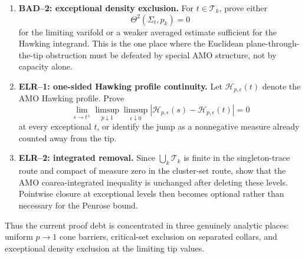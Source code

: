 \begin{remark}
\begin{enumerate}
    \item \textbf{BAD--2: exceptional density exclusion.}
    For \(t\in\mathcal T_k\), prove either
    \[
        \Theta^2(\Sigma_t,p_k)=0
    \]
    for the limiting varifold or a weaker averaged estimate sufficient for the
    Hawking integrand.  This is the one place where the Euclidean
    plane-through-the-tip obstruction must be defeated by special AMO
    structure, not by capacity alone.

    \item \textbf{ELR--1: one-sided Hawking profile continuity.}
    Let \(\mathcal H_{p,\epsilon}(t)\) denote the AMO Hawking profile.  Prove
    \[
        \lim_{s\to t^\pm}
        \limsup_{p\downarrow1}\limsup_{\epsilon\downarrow0}
        |\mathcal H_{p,\epsilon}(s)-\mathcal H_{p,\epsilon}(t)|=0
    \]
    at every exceptional \(t\), or identify the jump as a nonnegative measure
    already counted away from the tip.

    \item \textbf{ELR--2: integrated removal.}
    Since \(\bigcup_k\mathcal T_k\) is finite in the singleton-trace route and
    compact of measure zero in the cluster-set route, show that the AMO
    coarea-integrated inequality is unchanged after deleting these levels.
    Pointwise closure at exceptional levels then becomes optional rather than
    necessary for the Penrose bound.
\end{enumerate}
Thus the current proof debt is concentrated in three genuinely analytic
places: uniform \(p\to1\) cone barriers, critical-set exclusion on separated
collars, and exceptional density exclusion at the limiting tip values.
\end{remark}

